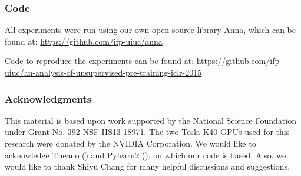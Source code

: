 \documentclass{article} \usepackage{iclr2015,times}
\begin{document}
\subsubsection*{Code}
All experiments were run using our own open source library Anna, which can be found at: \url{https://github.com/ifp-uiuc/anna}

Code to reproduce the experiments can be found at: \url{https://github.com/ifp-uiuc/an-analysis-of-unsupervised-pre-training-iclr-2015}

\subsubsection*{Acknowledgments}
This material is based upon work supported by the National Science Foundation under Grant No. 392 NSF IIS13-18971. The two Tesla K40 GPUs used for this research were donated by the NVIDIA Corporation. We would like to acknowledge Theano (\citet{bergstra2010theano}) and Pylearn2 (\citet{goodfellow2013pylearn2}), on which our code is based. Also, we would like to thank Shiyu Chang for many helpful discussions and suggestions.



\end{document}
